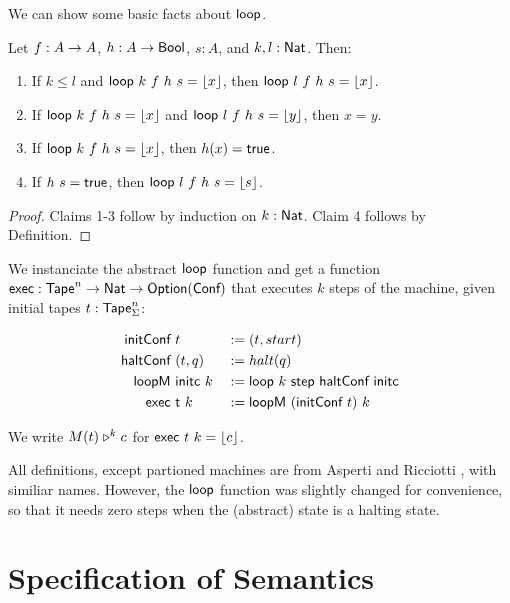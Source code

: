 We can show some basic facts about $\textsf{loop}$.
\begin{lemma}
  \label{lem:loop}
  Let $f : A \rightarrow A$, $h : A \rightarrow \textsf{Bool}$, $s:A$, and $k, l:\textsf{Nat}$.  Then:
  \begin{enumerate}
  \item If $k \le l$ and $\textsf{loop}~k~f~h~s = \left\lfloor {x}\right\rfloor$, then $\textsf{loop}~l~f~h~s = \left\lfloor {x}\right\rfloor$.
  \item If $\textsf{loop}~k~f~h~s = \left\lfloor {x}\right\rfloor$ and $\textsf{loop}~l~f~h~s = \left\lfloor {y}\right\rfloor$, then $x = y$.
  \item If $\textsf{loop}~k~f~h~s = \left\lfloor {x}\right\rfloor$, then $h(x) = \textsf{true}$.
  \item If $h~s = \textsf{true}$, then $\textsf{loop}~l~f~h~s = \left\lfloor {s}\right\rfloor$.
  \end{enumerate}
\end{lemma}
\begin{proof}
  Claims 1-3 follow by induction on $k:\textsf{Nat}$.  Claim 4 follows by Definition.
\end{proof}


We instanciate the abstract $\textsf{loop}$ function and get a function $\textsf{exec} : \textsf{Tape}^n \rightarrow \textsf{Nat} \rightarrow \textsf{Option}(\textsf{Conf})$ that executes $k$ steps
of the machine, given initial tapes $t: \textsf{Tape}_\Sigma^n$:

\begin{definition}
  \begin{alignat*}{3}
    \textsf{initConf}   &~t               &&:= (t, start) \\
    \textsf{haltConf}   &~(t, q)          &&:= halt(q) \\
    \textsf{loopM}      &~\textsf{initc}~k    &&:= \textsf{loop}~k~\textsf{step}~\textsf{haltConf}~\textsf{initc} \\
    \textsf{exec}       &~\textsf{t}~k        &&:= \textsf{loopM}~(\textsf{initConf}~t)~k
  \end{alignat*}
\end{definition}

We write $M(t) \mathrel{\triangleright}^k c$ for $\textsf{exec}~t~k = \left\lfloor {c}\right\rfloor$.

All definitions, except partioned machines are from Asperti and Ricciotti \cite{asperti2015}, with similiar names.  However, the $\textsf{loop}$ function
was slightly changed for convenience, so that it needs zero steps when the (abstract) state is a halting state.

\section{Specification of Semantics}
\label{sec:spec_semantics}

